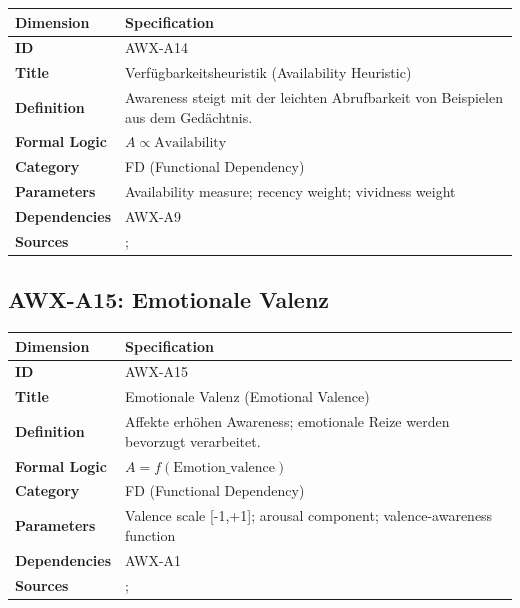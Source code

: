 \begin{table}[htbp]
\small
\begin{tabular}{p{3cm}p{11cm}}
\toprule
\textbf{Dimension} & \textbf{Specification} \\
\midrule
\textbf{ID} & AWX-A14 \\
\textbf{Title} & Verfügbarkeitsheuristik (Availability Heuristic) \\
\textbf{Definition} & Awareness steigt mit der leichten Abrufbarkeit von Beispielen aus dem Gedächtnis. \\
\textbf{Formal Logic} & $A \propto \text{Availability}$ \\
\textbf{Category} & FD (Functional Dependency) \\
\textbf{Parameters} & Availability measure; recency weight; vividness weight \\
\textbf{Dependencies} & AWX-A9 \\
\textbf{Sources} & \citet{PAP-tversky1973availability}; \citet{PAP-PAP-kahneman1979prospectprospect} \\
\bottomrule
\end{tabular}
\end{table}


\subsection{AWX-A15: Emotionale Valenz}

\begin{table}[htbp]
\small
\begin{tabular}{p{3cm}p{11cm}}
\toprule
\textbf{Dimension} & \textbf{Specification} \\
\midrule
\textbf{ID} & AWX-A15 \\
\textbf{Title} & Emotionale Valenz (Emotional Valence) \\
\textbf{Definition} & Affekte erhöhen Awareness; emotionale Reize werden bevorzugt verarbeitet. \\
\textbf{Formal Logic} & $A = f(\text{Emotion\_valence})$ \\
\textbf{Category} & FD (Functional Dependency) \\
\textbf{Parameters} & Valence scale [-1,+1]; arousal component; valence-awareness function \\
\textbf{Dependencies} & AWX-A1 \\
\textbf{Sources} & \citet{loewenstein2001risk}; \citet{slovic2004risk} \\
\bottomrule
\end{tabular}
\end{table}

